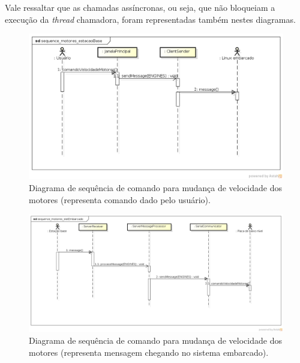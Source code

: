 Vale ressaltar que as chamadas assíncronas, ou seja, que não bloqueiam a execução da \textit{thread} chamadora, foram representadas também nestes diagramas.

\begin{figure}[H]
  \centering
  \includegraphics[width=\textwidth, keepaspectratio]{./figuras/estacaoBase/sequence_motores_estacaoBase.png}
  \caption{Diagrama de sequência de comando para mudança de velocidade dos motores (representa comando dado pelo usuário).}
  \label{fig:diagrama_sequencia_motores_estacao_base}
\end{figure}

\begin{figure}[H]
  \centering
  \includegraphics[width=\textwidth, keepaspectratio]{./figuras/sistEmbarcado/sequence_motores_sistEmbarcado.png}
  \caption{Diagrama de sequência de comando para mudança de velocidade dos motores (representa mensagem chegando no sistema embarcado).}
  \label{fig:diagrama_sequencia_motores_sist_embarcado}
\end{figure}

